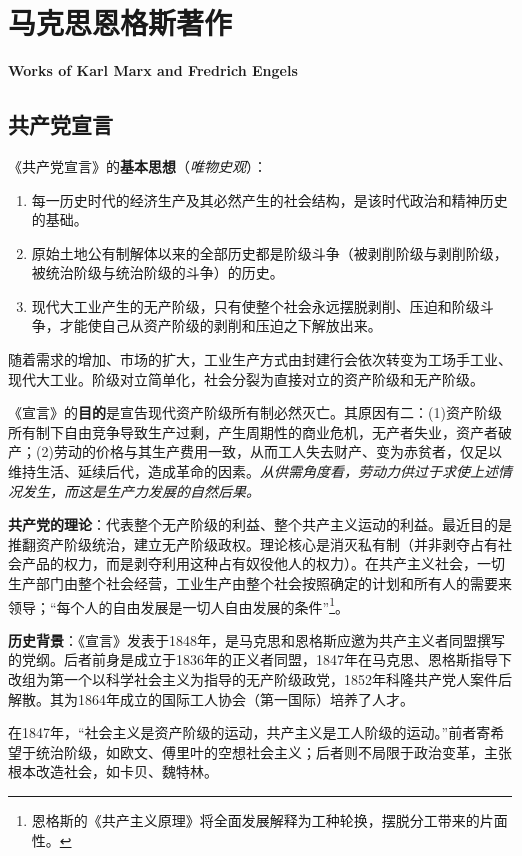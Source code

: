 \chapter{马克思恩格斯著作}
\Large\textbf{Works of Karl Marx and Fredrich Engels}\normalsize

\section{共产党宣言}

\par 《共产党宣言》的\textbf{基本思想}（\emph{唯物史观}）：
\begin{enumerate}
    \item 每一历史时代的经济生产及其必然产生的社会结构，是该时代政治和精神历史的基础。
    \item 原始土地公有制解体以来的全部历史都是阶级斗争（被剥削阶级与剥削阶级，被统治阶级与统治阶级的斗争）的历史。
    \item 现代大工业产生的无产阶级，只有使整个社会永远摆脱剥削、压迫和阶级斗争，才能使自己从资产阶级的剥削和压迫之下解放出来。
\end{enumerate}

\par 随着需求的增加、市场的扩大，工业生产方式由封建行会依次转变为工场手工业、现代大工业。阶级对立简单化，社会分裂为直接对立的资产阶级和无产阶级。

\par 《宣言》的\textbf{目的}是宣告现代资产阶级所有制必然灭亡。其原因有二：(1)资产阶级所有制下自由竞争导致生产过剩，产生周期性的商业危机，无产者失业，资产者破产；(2)劳动的价格与其生产费用一致，从而工人失去财产、变为赤贫者，仅足以维持生活、延续后代，造成革命的因素。\emph{从供需角度看，劳动力供过于求使上述情况发生，而这是生产力发展的自然后果。}

\par \textbf{共产党的理论}：代表整个无产阶级的利益、整个共产主义运动的利益。最近目的是推翻资产阶级统治，建立无产阶级政权。理论核心是消灭私有制（并非剥夺占有社会产品的权力，而是剥夺利用这种占有奴役他人的权力）。在共产主义社会，一切生产部门由整个社会经营，工业生产由整个社会按照确定的计划和所有人的需要来领导；“每个人的自由发展是一切人自由发展的条件”\footnote{恩格斯的《共产主义原理》将全面发展解释为工种轮换，摆脱分工带来的片面性。}。

\par \textbf{历史背景}：《宣言》发表于1848年，是马克思和恩格斯应邀为共产主义者同盟撰写的党纲。后者前身是成立于1836年的正义者同盟，1847年在马克思、恩格斯指导下改组为第一个以科学社会主义为指导的无产阶级政党，1852年科隆共产党人案件后解散。其为1864年成立的国际工人协会（第一国际）培养了人才。

\par 在1847年，“社会主义是资产阶级的运动，共产主义是工人阶级的运动。”前者寄希望于统治阶级，如欧文、傅里叶的空想社会主义；后者则不局限于政治变革，主张根本改造社会，如卡贝、魏特林。